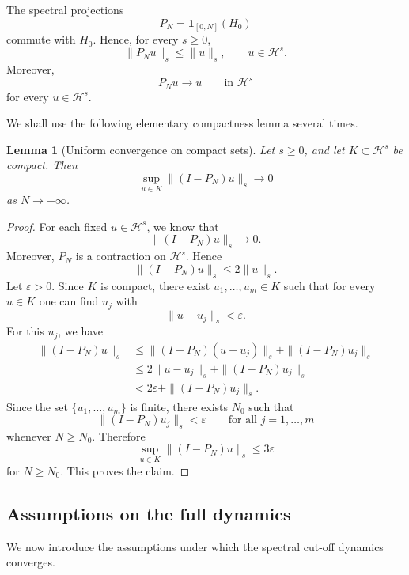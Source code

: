 \documentclass[10pt,a4paper]{amsart}
\newtheorem{lemma}[theorem]{Lemma}
\newcommand{\Hilb}{\mathcal H}
\begin{document}
The spectral projections
\[
        P_N=\mathbf 1_{[0,N]}(H_0)
\]
commute with \(H_0\).  Hence, for every \(s\geq0\),
\[
        \|P_Nu\|_s\leq \|u\|_s,
        \qquad u\in\Hilb^s.
\]
Moreover,
\[
        P_Nu\longrightarrow u
        \qquad\text{in }\Hilb^s
\]
for every \(u\in\Hilb^s\).

We shall use the following elementary compactness lemma several times.

\begin{lemma}[Uniform convergence on compact sets]
\label{lem:uniform-tail}
Let \(s\geq0\), and let \(K\subset\Hilb^s\) be compact.  Then
\[
        \sup_{u\in K}\|(I-P_N)u\|_s
        \longrightarrow0
\]
as \(N\to+\infty\).
\end{lemma}

\begin{proof}
For each fixed \(u\in\Hilb^s\), we know that
\[
        \|(I-P_N)u\|_s\longrightarrow0.
\]
Moreover, \(P_N\) is a contraction on \(\Hilb^s\).  Hence
\[
        \|(I-P_N)u\|_s\leq 2\|u\|_s.
\]
Let \(\varepsilon>0\).  Since \(K\) is compact, there exist
\(u_1,\ldots,u_m\in K\) such that for every \(u\in K\) one can find
\(u_j\) with
\[
        \|u-u_j\|_s<\varepsilon.
\]
For this \(u_j\), we have
\[
\begin{aligned}
        \|(I-P_N)u\|_s
        &\leq
        \|(I-P_N)(u-u_j)\|_s
        +
        \|(I-P_N)u_j\|_s    \\
        &\leq
        2\|u-u_j\|_s
        +
        \|(I-P_N)u_j\|_s    \\
        &<
        2\varepsilon
        +
        \|(I-P_N)u_j\|_s .
\end{aligned}
\]
Since the set \(\{u_1,\ldots,u_m\}\) is finite, there exists
\(N_0\) such that
\[
        \|(I-P_N)u_j\|_s<\varepsilon
        \qquad
        \text{for all }j=1,\ldots,m
\]
whenever \(N\geq N_0\).  Therefore
\[
        \sup_{u\in K}\|(I-P_N)u\|_s
        \leq 3\varepsilon
\]
for \(N\geq N_0\).  This proves the claim.
\end{proof}

\subsection{Assumptions on the full dynamics}

We now introduce the assumptions under which the spectral cut-off
dynamics converges.
\end{document}
